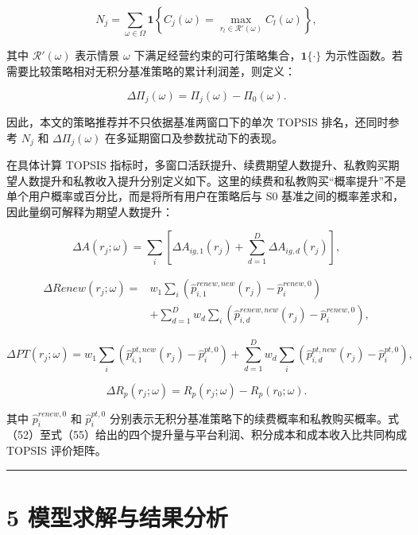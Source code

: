 \documentclass[
  12pt,
]{ctexart}
\begin{document}
\[
N_j=\sum_{\omega\in\Omega}\mathbf{1}\left\{C_j(\omega)=\max_{r_l\in\mathcal{R}'(\omega)}C_l(\omega)\right\},
\tag{50}
\]

其中 \(\mathcal{R}'(\omega)\) 表示情景 \(\omega\) 下满足经营约束的可行策略集合，\(\mathbf{1}\{\cdot\}\) 为示性函数。若需要比较策略相对无积分基准策略的累计利润差，则定义：

\[
\Delta \Pi_j(\omega)=\Pi_j(\omega)-\Pi_0(\omega).
\tag{51}
\]

因此，本文的策略推荐并不只依据基准两窗口下的单次 TOPSIS 排名，还同时参考 \(N_j\) 和 \(\Delta \Pi_j(\omega)\) 在多延期窗口及参数扰动下的表现。

在具体计算 TOPSIS 指标时，多窗口活跃提升、续费期望人数提升、私教购买期望人数提升和私教收入提升分别定义如下。这里的续费和私教购买``概率提升''不是单个用户概率或百分比，而是将所有用户在策略后与 S0 基准之间的概率差求和，因此量纲可解释为期望人数提升：

\[
\Delta A(r_j;\omega)=\sum_i\left[\Delta A_{ig,1}(r_j)+\sum_{d=1}^{D}\Delta A_{ig,d}(r_j)\right],
\tag{52}
\]

\[
\begin{aligned}
\Delta Renew(r_j;\omega)=&
w_1\sum_i\left(\hat p_{i,1}^{renew,new}(r_j)-\hat p_{i}^{renew,0}\right)\\
&+\sum_{d=1}^{D}w_d\sum_i
\left(\hat p_{i,d}^{renew,new}(r_j)-\hat p_{i}^{renew,0}\right),
\end{aligned}
\tag{53}
\]

\[
\Delta PT(r_j;\omega)=
w_1\sum_i\left(\hat p_{i,1}^{pt,new}(r_j)-\hat p_{i}^{pt,0}\right)
 + \sum_{d=1}^{D}w_d\sum_i\left(\hat p_{i,d}^{pt,new}(r_j)-\hat p_{i}^{pt,0}\right),
\tag{54}
\]

\[
\Delta R_p(r_j;\omega)=R_p(r_j;\omega)-R_p(r_0;\omega).
\tag{55}
\]

其中 \(\hat p_i^{renew,0}\) 和 \(\hat p_i^{pt,0}\) 分别表示无积分基准策略下的续费概率和私教购买概率。式（52）至式（55）给出的四个提升量与平台利润、积分成本和成本收入比共同构成 TOPSIS 评价矩阵。

\begin{center}\rule{0.5\linewidth}{0.5pt}\end{center}

\hypertarget{ux6a21ux578bux6c42ux89e3ux4e0eux7ed3ux679cux5206ux6790}{%
\section{5 模型求解与结果分析}\label{ux6a21ux578bux6c42ux89e3ux4e0eux7ed3ux679cux5206ux6790}}
\end{document}
